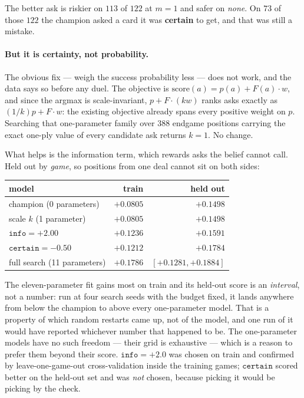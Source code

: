 \documentclass[11pt,a4paper]{article}
\begin{document}
The better ask is riskier on $113$ of $122$ at $m = 1$ and safer on
\emph{none}. On $73$ of those $122$ the champion asked a card it was
\textbf{certain} to get, and that was still a mistake.

\paragraph{But it is certainty, not probability.} The obvious fix --- weigh
the success probability less --- does not work, and the data says so before any
duel. The objective is $\mathrm{score}(a) = p(a) + F(a)\cdot w$, and since the
argmax is scale-invariant, $p + F\cdot(kw)$ ranks asks exactly as
$(1/k)p + F\cdot w$: the existing objective already spans every positive weight
on $p$. Searching that one-parameter family over $388$ endgame positions
carrying the exact one-ply value of every candidate ask returns $k = 1$. No
change.

What helps is the information term, which rewards asks the belief cannot call.
Held out by \emph{game}, so positions from one deal cannot sit on both sides:

\begin{center}
\begin{tabular}{lrr}
\toprule
model & train & held out \\
\midrule
champion (0 parameters)      & $+0.0805$ & $+0.1498$ \\
scale $k$ (1 parameter)      & $+0.0805$ & $+0.1498$ \\
$\mathtt{info} = +2.00$      & $+0.1236$ & $+0.1591$ \\
$\mathtt{certain} = -0.50$   & $+0.1212$ & $+0.1784$ \\
full search (11 parameters)  & $+0.1786$ & $[+0.1281, +0.1884]$ \\
\bottomrule
\end{tabular}
\end{center}

The eleven-parameter fit gains most on train and its held-out score is an
\emph{interval}, not a number: run at four search seeds with the budget fixed,
it lands anywhere from below the champion to above every one-parameter model.
That is a property of which random restarts came up, not of the model, and one
run of it would have reported whichever number that happened to be. The
one-parameter models have no such freedom --- their grid is exhaustive --- which
is a reason to prefer them beyond their score. $\mathtt{info} = +2.0$ was
chosen on train and confirmed by leave-one-game-out cross-validation inside the
training games; $\mathtt{certain}$ scored better on the held-out set and was
\emph{not} chosen, because picking it would be picking by the check.
\end{document}
